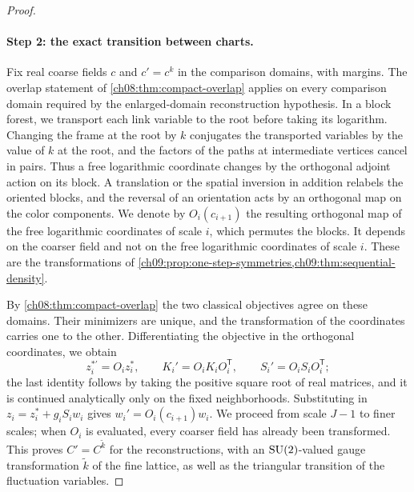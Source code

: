 \begin{proof}
\paragraph{Step 2: the exact transition between charts.}
Fix real coarse fields $c$ and $c'=c^k$ in the comparison domains, with margins. The overlap statement of \cref{ch08:thm:compact-overlap} applies on every comparison domain required by the enlarged-domain reconstruction hypothesis. In a block forest, we transport each link variable to the root before taking its logarithm. Changing the frame at the root by $k$ conjugates the transported variables by the value of $k$ at the root, and the factors of the paths at intermediate vertices cancel in pairs. Thus a free logarithmic coordinate changes by the orthogonal adjoint action on its block. A translation or the spatial inversion in addition relabels the oriented blocks, and the reversal of an orientation acts by an orthogonal map on the color components. We denote by $O_i(c_{i+1})$ the resulting orthogonal map of the free logarithmic coordinates of scale $i$, which permutes the blocks. It depends on the coarser field and not on the free logarithmic coordinates of scale $i$. These are the transformations of \cref{ch09:prop:one-step-symmetries,ch09:thm:sequential-density}.

By \cref{ch08:thm:compact-overlap} the two classical objectives agree on these domains. Their minimizers are unique, and the transformation of the coordinates carries one to the other. Differentiating the objective in the orthogonal coordinates, we obtain
\[
 z_i^{*\prime}=O_iz_i^*,\qquad K_i'=O_iK_iO_i^{\mathsf T},\qquad S_i'=O_iS_iO_i^{\mathsf T};
\]
the last identity follows by taking the positive square root of real matrices, and it is continued analytically only on the fixed neighborhoods. Substituting in $z_i=z_i^*+g_iS_iw_i$ gives $w_i'=O_i(c_{i+1})w_i$. We proceed from scale $J-1$ to finer scales; when $O_i$ is evaluated, every coarser field has already been transformed. This proves $C'=C^{\widetilde k}$ for the reconstructions, with an $\mathrm{SU}(2)$-valued gauge transformation $\widetilde k$ of the fine lattice, as well as the triangular transition of the fluctuation variables.


\end{proof}
